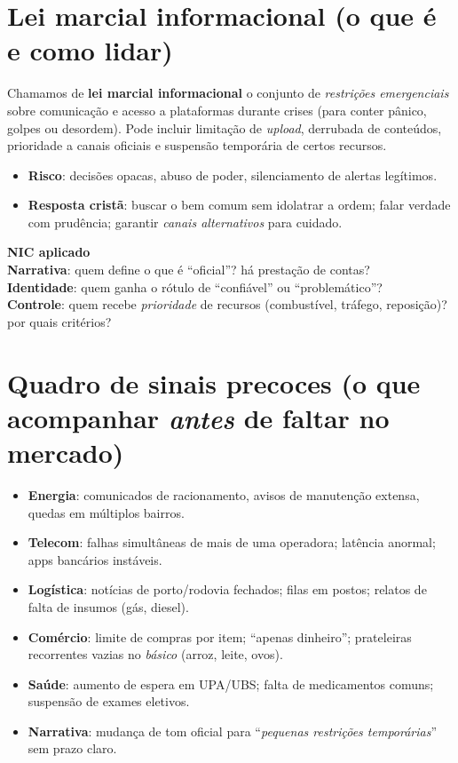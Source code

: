 \section{Lei marcial informacional (o que é e como lidar)}
Chamamos de \textbf{lei marcial informacional} o conjunto de \emph{restrições emergenciais} sobre comunicação e acesso a plataformas durante crises (para conter pânico, golpes ou desordem). Pode incluir limitação de \emph{upload}, derrubada de conteúdos, prioridade a canais oficiais e suspensão temporária de certos recursos.
\begin{itemize}[leftmargin=*,noitemsep]
  \item \textbf{Risco}: decisões opacas, abuso de poder, silenciamento de alertas legítimos.
  \item \textbf{Resposta cristã}: buscar o bem comum sem idolatrar a ordem; falar verdade com prudência; garantir \emph{canais alternativos} para cuidado.
\end{itemize}

\begin{nicbox}
\textbf{NIC aplicado}\\
\textbf{Narrativa}: quem define o que é ``oficial''? há prestação de contas?\\
\textbf{Identidade}: quem ganha o rótulo de ``confiável'' ou ``problemático''?\\
\textbf{Controle}: quem recebe \emph{prioridade} de recursos (combustível, tráfego, reposição)? por quais critérios?
\end{nicbox}

\section{Quadro de sinais precoces (o que acompanhar \emph{antes} de faltar no mercado)}
\begin{checklist}[title={Indicadores práticos para leigos}]
\begin{itemize}[leftmargin=*,noitemsep]
  \item \textbf{Energia}: comunicados de racionamento, avisos de manutenção extensa, quedas em múltiplos bairros.
  \item \textbf{Telecom}: falhas simultâneas de mais de uma operadora; latência anormal; apps bancários instáveis.
  \item \textbf{Logística}: notícias de porto/rodovia fechados; filas em postos; relatos de falta de insumos (gás, diesel).
  \item \textbf{Comércio}: limite de compras por item; “apenas dinheiro”; prateleiras recorrentes vazias no \emph{básico} (arroz, leite, ovos).
  \item \textbf{Saúde}: aumento de espera em UPA/UBS; falta de medicamentos comuns; suspensão de exames eletivos.
  \item \textbf{Narrativa}: mudança de tom oficial para ``\emph{pequenas restrições temporárias}'' sem prazo claro.
\end{itemize}
\end{checklist}

